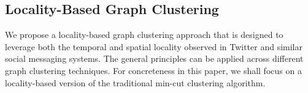 \documentclass{sig-alternate}
\begin{document}








\subsection{Locality-Based Graph Clustering}
We propose a locality-based graph clustering approach that is designed to leverage both the temporal and spatial locality observed in Twitter and similar social messaging systems. The general principles can be applied across different graph clustering techniques. For concreteness in this paper, we shall focus on a locality-based version of the traditional min-cut clustering algorithm. 
\end{document}
